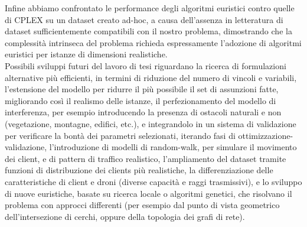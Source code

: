 Infine abbiamo confrontato le performance degli algoritmi euristici contro quelle di CPLEX su un dataset creato ad-hoc, a causa dell'assenza in letteratura di dataset sufficientemente compatibili con il nostro problema, dimostrando che la complessità intrinseca del problema richieda espressamente l'adozione di algoritmi euristici per istanze di dimensioni realistiche. \\
Possibili sviluppi futuri del lavoro di tesi riguardano la ricerca di formulazioni alternative più efficienti, in termini di riduzione del numero di vincoli e variabili, l'estensione del modello per ridurre il più possibile il set di assunzioni fatte, migliorando così il realismo delle istanze, il perfezionamento del modello di interferenza, per esempio introducendo la presenza di ostacoli naturali e non (vegetazione, montagne, edifici, etc.), e integrandolo in un sistema di validazione per verificare la bontà dei parametri selezionati, iterando fasi di ottimizzazione-validazione, l'introduzione di modelli di random-walk, per simulare il movimento dei client, e di pattern di traffico realistico, l'ampliamento del dataset tramite funzioni di distribuzione dei clients più realistiche, la differenziazione delle caratteristiche di client e droni (diverse capacità e raggi trasmissivi), e lo sviluppo di nuove euristiche, basate su ricerca locale o algoritmi genetici, che risolvano il problema con approcci differenti (per esempio dal punto di vista geometrico dell'intersezione di cerchi, oppure della topologia dei grafi di rete).    
